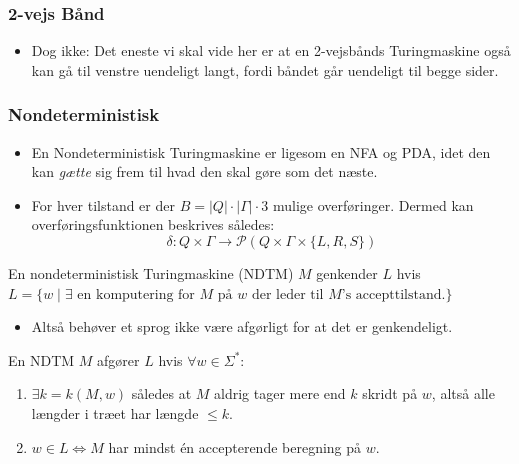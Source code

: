 \begin{frame}
  \frametitle{2-vejs Bånd}
  \begin{itemize}
    \item Dog ikke: Det eneste vi skal vide her er at en 2-vejsbånds Turingmaskine også kan gå til venstre uendeligt langt, fordi båndet går uendeligt til begge sider.
  \end{itemize}
\end{frame}



\begin{frame}[allowframebreaks]
  \frametitle{Nondeterministisk}

  \begin{itemize}
    \item En Nondeterministisk Turingmaskine er ligesom en NFA og PDA, idet den kan \textit{gætte} sig frem til hvad den skal gøre som det næste.
    \item For hver tilstand er der $B = |Q| \cdot |\Gamma| \cdot 3$ mulige overføringer. Dermed kan overføringsfunktionen beskrives således:
          \begin{equation}
\delta : Q \times \Gamma \longrightarrow \mathcal{P}(Q \times \Gamma \times \{L,R,S\})
          \end{equation}
  \end{itemize}

  \begin{definition}
En nondeterministisk Turingmaskine (NDTM) $M$ genkender $L$ hvis $L = \{w \mid \exists \text{ en komputering for } M \text{ på } w \text{ der leder til } M \text{'s accepttilstand.}\}$
  \end{definition}

  \begin{itemize}
    \item Altså behøver et sprog ikke være afgørligt for at det er genkendeligt.
  \end{itemize}

  \begin{definition}
    En NDTM $M$ afgører $L$ hvis $\forall w \in \Sigma^{*}$:
    \begin{enumerate}
      \item $\exists k = k(M,w)$ således at $M$ aldrig tager mere end $k$ skridt på $w$, altså alle længder i træet har længde $\le k$.
      \item $w \in L \iff M$ har mindst én accepterende beregning på $w$.
    \end{enumerate}
  \end{definition}


\end{frame}

